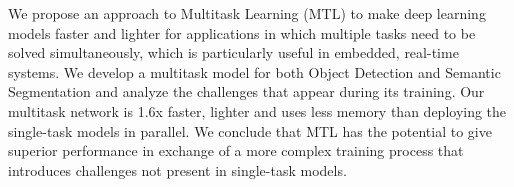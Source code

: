 We propose an approach to Multitask Learning (MTL) to make deep learning models faster and lighter for applications in which multiple tasks need to be solved simultaneously, which is particularly useful in embedded, real-time systems.
We develop a multitask model for both Object Detection and Semantic Segmentation and analyze the challenges that appear during its training. Our multitask network is 1.6x faster, lighter and uses less memory than deploying the single-task models in parallel.
We conclude that MTL has the potential to give superior performance in exchange of a more complex training process that introduces challenges not present in single-task models.